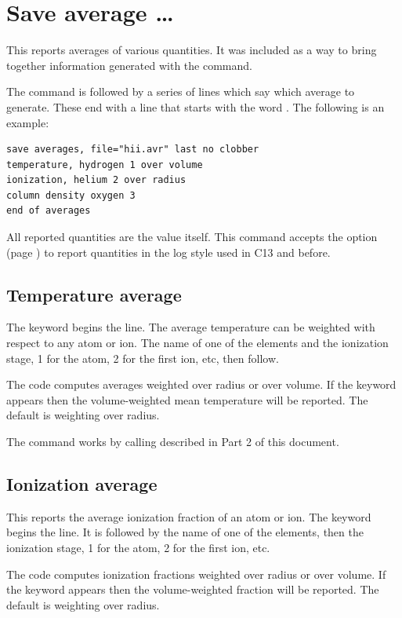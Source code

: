 \section{Save average \dots}
\label{sec:CommandSaveAverage}

This reports averages of various quantities.
It was included as a way
to bring together information generated with the  command.

The  command is followed by a series of lines
which say which average to generate.
These end with a line that starts with the word .
The following is an example:
\begin{verbatim}
save averages, file="hii.avr" last no clobber
temperature, hydrogen 1 over volume
ionization, helium 2 over radius
column density oxygen 3
end of averages
\end{verbatim}

All reported quantities are the value itself.
This command accepts the  option 
(page \pageref{sec:SaveLogOption}) to report quantities in the
log style used in C13 and before. 

\subsection{Temperature average}

The keyword  begins the line.
The average temperature can
be weighted with respect to any atom or ion.
The name of one of the elements
and the ionization stage, 1 for the atom, 2 for the first ion, etc,
then follow.

The code computes averages weighted over radius or over volume.
If the
keyword  appears then the volume-weighted mean temperature will be
reported.
The default is weighting over radius.

The command works by calling  described in
Part 2 of this document.

\subsection{Ionization average}

This reports the average ionization fraction of an atom or ion.
The
keyword  begins the line.
It is followed by the name of one of
the elements, then the ionization stage, 1 for the atom, 2 for the first
ion, etc.

The code computes ionization fractions weighted over radius or over
volume.
If the keyword  appears then the volume-weighted fraction
will be reported.
The default is weighting over radius.

